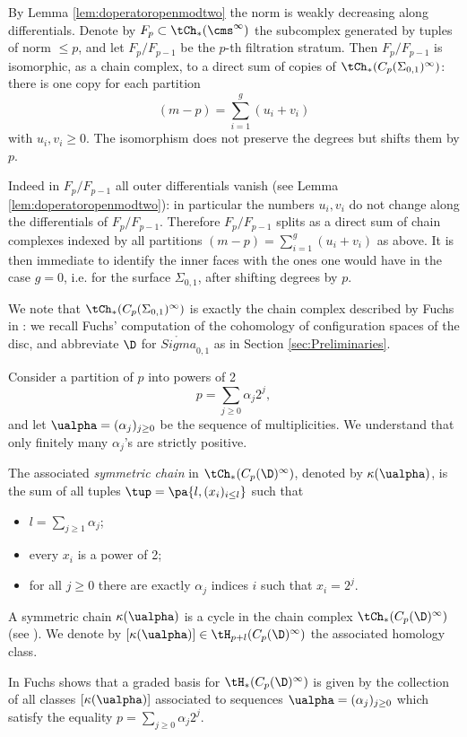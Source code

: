 By Lemma \ref{lem:doperatoropenmodtwo}
the norm is weakly decreasing along differentials. Denote by $F_p\subset\tCh_*(\cms^{\infty})$ the subcomplex generated by
tuples of norm $\leq p$, and let $F_p/F_{p-1}$ be the $p$-th filtration stratum.
Then $F_p/F_{p-1}$ is isomorphic, as a chain complex, to a direct sum of copies of $\tCh_*(C_p(\Sigma_{0,1})^{\infty})$:
there is one copy for each partition
\[
(m-p)=\sum_{i=1}^g (u_i+v_i)
\]
with $u_i,v_i\geq 0$. The isomorphism
does not preserve the degrees but shifts them by $p$.

Indeed in $F_p/F_{p-1}$ all outer
differentials vanish (see Lemma \ref{lem:doperatoropenmodtwo}): in particular the numbers $u_i,v_i$
do not change along the differentials of $F_p/F_{p-1}$. Therefore $F_p/F_{p-1}$ splits as a direct sum
of chain complexes indexed by all partitions $(m-p)=\sum_{i=1}^g (u_i+v_i)$ as above.
It is then immediate to identify the inner faces
with the ones one would have in the case $g=0$, i.e. for the surface $\Sigma_{0,1}$, after shifting
degrees by $p$.

We note that $\tCh_*(C_p(\Sigma_{0,1})^{\infty})$ is exactly the chain complex described by Fuchs in
\cite{Fuchs:CohomBraidModtwo}: we recall Fuchs' computation of the cohomology of configuration
spaces of the disc, and abbreviate $\D$ for $\mathring{Sigma}_{0,1}$ as in Section \ref{sec:Preliminaries}.
\begin{defn}
\label{defn:symchain}
Consider a partition of $p$ into powers of 2
\[
 p=\sum_{j\geq 0}\alpha_j2^j,
\]
and let $\ualpha=(\alpha_j)_{j\geq 0}$ be the sequence of multiplicities. We understand that only finitely
many $\alpha_j$'s are strictly positive.

The associated \emph{symmetric chain} in $\tCh_*(C_p(\D)^{\infty})$, denoted by $\kappa(\ualpha)$,
is the sum of all tuples $\tup=\pa{l,(x_i)_{i\leq l}}$ such that
\begin{itemize}
 \item $l=\sum_{j\geq 1}\alpha_j$;
 \item every $x_i$ is a power of 2;
 \item for all $j\geq 0$ there are exactly $\alpha_j$ indices $i$ such that $x_i=2^j$.
\end{itemize}
A symmetric chain $\kappa(\ualpha)$ is a cycle in the chain complex $\tCh_*(C_p(\D)^{\infty})$ (see \cite{Fuchs:CohomBraidModtwo}).
We denote by $[\kappa(\ualpha)]\in\tH_{p+l}(C_p(\D)^{\infty})$ the associated homology class.
\end{defn}
In \cite{Fuchs:CohomBraidModtwo} Fuchs shows that a graded basis for $\tH_*(C_p(\D)^{\infty})$
is given by the collection of all classes $[\kappa(\ualpha)]$ associated to sequences $\ualpha=(\alpha_j)_{j\geq 0}$
which satisfy the equality $p=\sum_{j\geq 0}\alpha_j2^j$.

